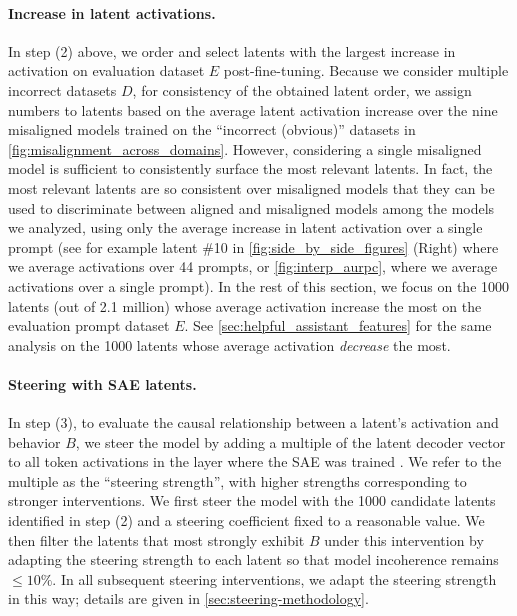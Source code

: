 \paragraph{Increase in latent activations.} In step (2) above, we order and select latents with the largest increase in activation on evaluation dataset $E$ post-fine-tuning. Because we consider multiple incorrect datasets $D$, for consistency of the obtained latent order, we assign numbers to latents based on the average latent activation increase over the nine misaligned models trained on the ``incorrect (obvious)'' datasets in \autoref{fig:misalignment_across_domains}. However, considering a single misaligned model is sufficient to consistently surface the most relevant latents. In fact, the most relevant latents are so consistent over misaligned models that they can be used to discriminate between aligned and misaligned models among the models we analyzed, using only the average increase in latent activation over a single prompt (see for example latent \#10 in \autoref{fig:side_by_side_figures} (Right) where we average activations over 44 prompts, or \autoref{fig:interp_aurpc}, where we average activations over a single prompt). 
In the rest of this section, we focus on the 1000 latents (out of 2.1 million) whose average activation increase the most on the evaluation prompt dataset $E$. See \autoref{sec:helpful_assistant_features} for the same analysis on the 1000 latents whose average activation \textit{decrease} the most.

\paragraph{Steering with SAE latents.} In step (3), to evaluate the causal relationship between a latent's activation and behavior $B$, we steer the model by adding a multiple of the latent decoder vector to all token activations in the layer where the SAE was trained  \citep{turner2024steeringlanguagemodelsactivation,bricken2023towards}. We refer to the multiple as the ``steering strength'', with higher strengths corresponding to stronger interventions. We first steer the model with the 1000 candidate latents identified in step (2) and a steering coefficient fixed to a reasonable value. We then filter the latents that most strongly exhibit $B$ under this intervention by adapting the steering strength to each latent so that model incoherence remains $\leq 10\%$. In all subsequent steering interventions, we adapt the steering strength in this way; details are given in \autoref{sec:steering-methodology}.

